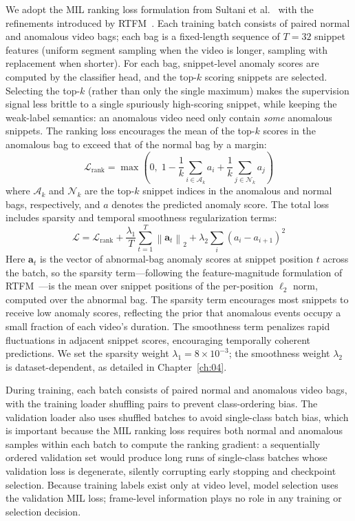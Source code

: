 We adopt the MIL ranking loss formulation from Sultani et al.~\cite{sultani2018ucfcrime} with the
refinements introduced by RTFM~\cite{tian2021rtfm}. Each training batch consists of paired normal
and anomalous video bags; each bag is a fixed-length sequence of $T=32$ snippet features (uniform
segment sampling when the video is longer, sampling with replacement when shorter). For each bag,
snippet-level anomaly scores are computed by the classifier head, and the top-$k$ scoring
snippets are selected. Selecting the top-$k$ (rather than only the single maximum) makes the
supervision signal less brittle to a single spuriously high-scoring snippet, while keeping the
weak-label semantics: an anomalous video need only contain \emph{some} anomalous snippets. The
ranking loss encourages the mean of the top-$k$ scores in the anomalous bag to exceed that of the
normal bag by a margin:
\begin{equation}
    \mathcal{L}_{\text{rank}} = \max\left(0,\; 1 - \frac{1}{k}\sum_{i \in \mathcal{A}_k} a_i + \frac{1}{k}\sum_{j \in \mathcal{N}_k} a_j\right)
\end{equation}
where $\mathcal{A}_k$ and $\mathcal{N}_k$ are the top-$k$ snippet indices in the anomalous and
normal bags, respectively, and $a$ denotes the predicted anomaly score. The total loss includes
sparsity and temporal smoothness regularization terms:
\begin{equation}
    \mathcal{L} = \mathcal{L}_{\text{rank}} + \frac{\lambda_1}{T}\sum_{t=1}^{T} \left\| \mathbf{a}_t \right\|_2 + \lambda_2 \sum_i (a_i - a_{i+1})^2
    \label{eq:loss}
\end{equation}
Here $\mathbf{a}_t$ is the vector of abnormal-bag anomaly scores at snippet position $t$ across
the batch, so the sparsity term---following the feature-magnitude formulation of
RTFM~\cite{tian2021rtfm}---is the mean over snippet positions of the per-position $\ell_2$ norm,
computed over the abnormal bag. The sparsity term encourages most snippets to receive low anomaly
scores, reflecting the prior that anomalous events occupy a small fraction of each video's
duration. The smoothness term penalizes rapid fluctuations in adjacent snippet scores,
encouraging temporally coherent predictions. We set the sparsity weight $\lambda_1 = 8 \times
10^{-3}$; the smoothness weight $\lambda_2$ is dataset-dependent, as detailed in
Chapter~\ref{ch:04}.

During training, each batch consists of paired normal and anomalous video bags, with the training
loader shuffling pairs to prevent class-ordering bias. The validation loader also uses shuffled
batches to avoid single-class batch bias, which is important because the MIL ranking loss
requires both normal and anomalous samples within each batch to compute the ranking gradient: a
sequentially ordered validation set would produce long runs of single-class batches whose
validation loss is degenerate, silently corrupting early stopping and checkpoint selection.
Because training labels exist only at video level, model selection uses the validation MIL loss;
frame-level information plays no role in any training or selection decision.


